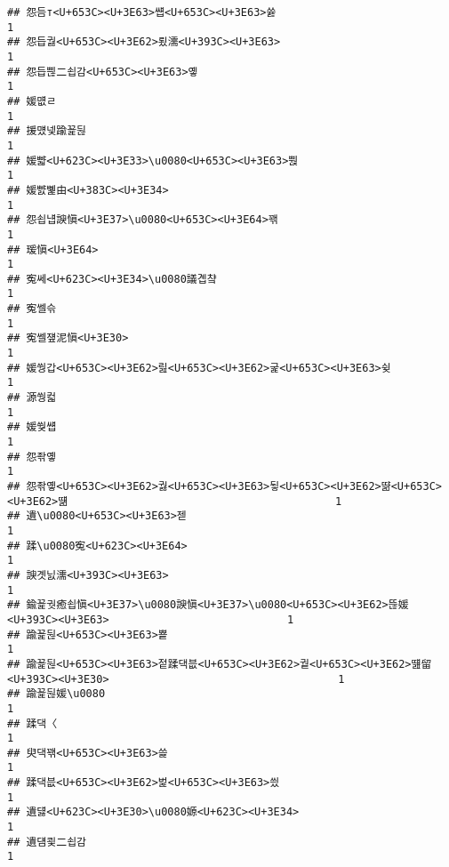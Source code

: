 \documentclass[]{article}
\begin{document}
\begin{verbatim}
## 怨듬т<U+653C><U+3E63>썝<U+653C><U+3E63>쓣                                                      1
## 怨듭궗<U+653C><U+3E62>룄濡<U+393C><U+3E63>                                                      1
## 怨듭쁺二쇱감<U+653C><U+3E63>옣                                                      1
## 媛먮ㄹ                                                                  1
## 援먰넻踰꾩뒪                                                            1
## 媛뺣<U+623C><U+3E33>\u0080<U+653C><U+3E63>뿭                                                    1
## 媛뺤뼱由<U+383C><U+3E34>                                                            1
## 怨쇱냽諛愼<U+3E37>\u0080<U+653C><U+3E64>꽦                                                1
## 瑗愼<U+3E64>                                                                  1
## 寃쎄<U+623C><U+3E34>\u0080議곕챸                                                    1
## 寃쎌슦                                                                  1
## 寃쎌쟾泥愼<U+3E30>                                                            1
## 媛쒕갑<U+653C><U+3E62>릺<U+653C><U+3E62>굹<U+653C><U+3E63>슂                                                1
## 源쒕컯                                                                  1
## 媛쒖썝                                                                  1
## 怨좎옣                                                                  1
## 怨좎옣<U+653C><U+3E62>궗<U+653C><U+3E63>뒿<U+653C><U+3E62>땲<U+653C><U+3E62>떎                                          1
## 遺\u0080<U+653C><U+3E63>젣                                                          1
## 蹂\u0080寃<U+623C><U+3E64>                                                          1
## 諛곗닔濡<U+393C><U+3E63>                                                            1
## 鍮꾩궛癒쇱愼<U+3E37>\u0080諛愼<U+3E37>\u0080<U+653C><U+3E62>뜮媛<U+393C><U+3E63>                            1
## 踰꾩뒪<U+653C><U+3E63>뿉                                                            1
## 踰꾩뒪<U+653C><U+3E63>젙蹂댁븞<U+653C><U+3E62>궡<U+653C><U+3E62>떒留<U+393C><U+3E30>                                    1
## 踰꾩뒪媛\u0080                                                          1
## 蹂댁〈                                                                  1
## 臾댁꽦<U+653C><U+3E63>쓽                                                            1
## 蹂댁븞<U+653C><U+3E62>벑<U+653C><U+3E63>씠                                                      1
## 遺덇<U+623C><U+3E30>\u0080嫄<U+623C><U+3E34>                                                    1
## 遺덈쾿二쇱감                                                            1

\end{verbatim}
\end{document}
